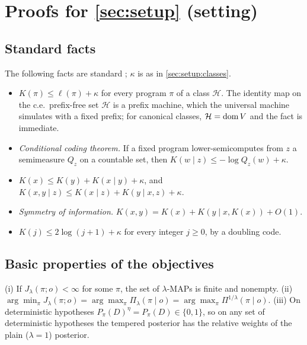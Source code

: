 \section{Proofs for \texorpdfstring{\cref{sec:setup}}{Section \ref*{sec:setup}} (setting)}\label{app:setup}

\subsection{Standard facts}\label{app:setup:facts}

The following facts are standard \citep{li2008introduction}; $\kappa$ is as in \cref{sec:setup:classes}.
\begin{itemize}[itemsep=0pt]
\item[(F1)] $K(\pi)\le\ell(\pi)+\kappa$ for every program $\pi$ of a class $\mathcal H$. The identity map on the c.e.\ prefix-free set $\mathcal H$ is a prefix machine, which the universal machine simulates with a fixed prefix; for canonical classes, $\mathcal H=\operatorname{dom} V$ and the fact is immediate.
\item[(F2)] \emph{Conditional coding theorem.} If a fixed program lower-semicomputes from $z$ a semimeasure $Q_z$ on a countable set, then $K(w\mid z)\le-\log Q_z(w)+\kappa$.
\item[(F3)] $K(x)\le K(y)+K(x\mid y)+\kappa$, and $K(x,y\mid z)\le K(x\mid z)+K(y\mid x,z)+\kappa$.
\item[(F4)] \emph{Symmetry of information.} $K(x,y)=K(x)+K(y\mid x,K(x))+O(1)$.
\item[(F5)] $K(j)\le2\log(j+1)+\kappa$ for every integer $j\ge0$, by a doubling code.
\end{itemize}

\subsection{Basic properties of the objectives}\label{app:setup:basic}

\begin{lemma}\label{lem:setup:basic}
(i) If $J_\lambda(\pi;o)<\infty$ for some $\pi$, the set of $\lambda$-MAPs is finite and nonempty.
(ii) $\arg\min_\pi J_\lambda(\pi;o)=\arg\max_\pi\Pi_\lambda(\pi\mid o)=\arg\max_\pi\Pi^{1/\lambda}(\pi\mid o)$.
(iii) On deterministic hypotheses $P_\pi(D)^\eta=P_\pi(D)\in\{0,1\}$, so on any set of deterministic hypotheses the tempered posterior has the relative weights of the plain ($\lambda=1$) posterior.
\end{lemma}

